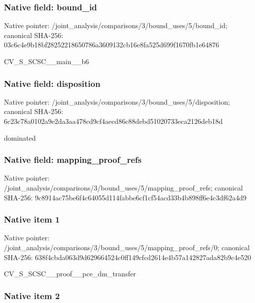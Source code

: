\documentclass[10pt,a4paper]{article}
\begin{document}
\subsubsection{Native field: bound\_id}


Native pointer: /joint\_analysis/comparis\allowbreak{}ons/3/bound\_uses/5/bound\allowbreak{}\_id; canonical SHA-256: 03c6c4e9b18bf28252218650\allowbreak{}786a3609132cb16e8fa525d6\allowbreak{}99f1670fb1e64876


CV\_S\_SCSC\_\_main\_\_b6


\subsubsection{Native field: disposition}


Native pointer: /joint\_analysis/comparis\allowbreak{}ons/3/bound\_uses/5/dispo\allowbreak{}sition; canonical SHA-256: 6c23c78a0102a9e2da3aa478\allowbreak{}cd9cf4aecd86c88debd51020\allowbreak{}733eca2126deb18d


dominated


\subsubsection{Native field: mapping\_proof\_refs}


Native pointer: /joint\_analysis/comparis\allowbreak{}ons/3/bound\_uses/5/mappi\allowbreak{}ng\_proof\_refs; canonical SHA-256: 9c8914ac75be6f4c64055d11\allowbreak{}4fabbe6cf1cf54acd33b4b89\allowbreak{}8ff6e4c3df62a4d9



\subsubsection{Native item 1}


Native pointer: /joint\_analysis/comparis\allowbreak{}ons/3/bound\_uses/5/mappi\allowbreak{}ng\_proof\_refs/0; canonical SHA-256: 638f4cbda063d9d629664524\allowbreak{}c0ff149cfcd2614e4b57a142\allowbreak{}827ada82b9c4e520


CV\_S\_SCSC\_\_proof\_\_pce\_dm\_transfer


\subsubsection{Native item 2}
\end{document}
